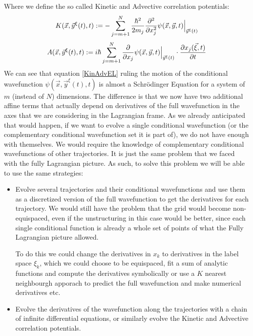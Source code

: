 \documentclass[11pt, a4paper]{article} %
\begin{document}
Where we define the so called Kinetic and Advective correlation potentials:
\begin{equation}\label{KinEL}
K(\vec{x}, \vec{y}^\xi(t),t):=-\sum_{j=m+1}^N \frac{\hbar^2}{2m_j}\pdv[2]{}{x_j} \psi(\vec{x}, \vec{y},t)\Big\rvert_{\vec{y}^\xi(t)}
\end{equation}
\begin{equation}\label{AdvEL}
A(\vec{x}, \vec{y}^\xi(t),t):=i\hbar\sum_{j=m+1}^N \pdv{}{x_j}\psi(\vec{x}, \vec{y},t)\Big\rvert_{\vec{y}^\xi(t)}\cdot \pdv{x_j(\vec{\xi},t)}{t}
\end{equation}
We can see that equation \eqref{KinAdvEL} ruling the motion of the conditional wavefunction $\psi(\vec{x}, \vec{y}^\xi(t),t)$ is almost a Schrödinger Equation for a system of $m$ (instead of $N$) dimensions. The difference is that we now have two additional affine terms that actually depend on derivatives of the full wavefunction in the axes that we are considering in the Lagrangian frame. As we already anticipated that would happen, if we want to evolve a single conditional wavefunction (or the complementary conditional wavefunction set it is part of), we do not have enough with themselves. We would require the knowledge of complementary conditional wavefunctions of other trajectories. It is just the same problem that we faced with the fully Lagrangian picture. As such, to solve this problem we will be able to use the same strategies: 
\begin{itemize}
\item Evolve several trajectories and their conditional wavefunctions and use them as a discretized version of the full wavefunction to get the derivatives for each trajectory. We would still have the problem that the grid would become non-equispaced, even if the unstructuring in this case would be better, since each single conditional function is already a whole set of points of what the Fully Lagrangian picture allowed.

To do this we could change the derivatives in $x_k$ to derivatives in the label space $\xi_k$, which we could choose to be equispaced, fit a sum of analytic functions and compute the derivatives symbolically or use a $K$ nearest neighbourgh apporach to predict the full wavefunction and make numerical derivatives etc.

\item Evolve the derivatives of the wavefunction along the trajectories with a chain of infinite differential equations, or similarly evolve the Kinetic and Advective correlation potentials.
\end{itemize}
\end{document}
